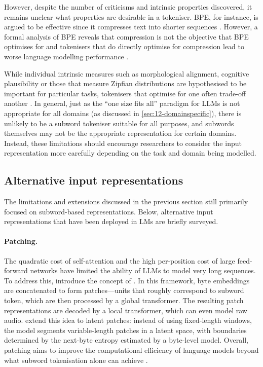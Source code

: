However, despite the number of criticisms and intrinsic properties discovered, it remains unclear what properties are desirable in a tokeniser. BPE, for instance, is argued to be effective since it compresses text into shorter sequences \citep{galle2019investigating}. However, a formal analysis of BPE reveals that compression is not the objective that BPE optimises for \citep{zouhar2023formal} and tokenisers that do directly optimise for compression lead to worse language modelling performance \citep{schmidt2024tokenization}. 

While individual intrinsic measures such as morphological alignment, cognitive plausibility or those that measure Zipfian distributions are hypothesised to be important for particular tasks, tokenisers that optimise for one often trade-off another \citep{uzan-etal-2024-greed, lotz2025beyond}. In general, just as the ``one size fits all'' paradigm for LLMs is not appropriate for all domains (as discussed in \cref{sec:12-domainspecific}), there is unlikely to be a subword tokeniser suitable for all purposes, and subwords themselves may not be the appropriate representation for certain domains. Instead, these limitations should encourage researchers to consider the input representation more carefully depending on the task and domain being modelled.

\subsection{Alternative input representations}\label{sec:12-alternative}

The limitations and extensions discussed in the previous section still primarily focused on subword-based representations. Below, alternative input representations that have been deployed in LMs are briefly surveyed.

\paragraph{Patching.} The quadratic cost of self-attention and the high per-position cost of large feed-forward networks have limited the ability of LLMs to model very long sequences. To address this, \citet{yu2023megabyte} introduce the concept of . In this framework, byte embeddings are concatenated to form patches—units that roughly correspond to subword token, which are then processed by a global transformer. The resulting patch representations are decoded by a local transformer, which can even model raw audio. \citet{pagnoni2024byte} extend this idea to latent patches: instead of using fixed-length windows, the model segments variable-length patches in a latent space, with boundaries determined by the next-byte entropy estimated by a byte-level model. Overall, patching aims to improve the computational efficiency of language models beyond what subword tokenisation alone can achieve \citep{shao2025beyond}.

